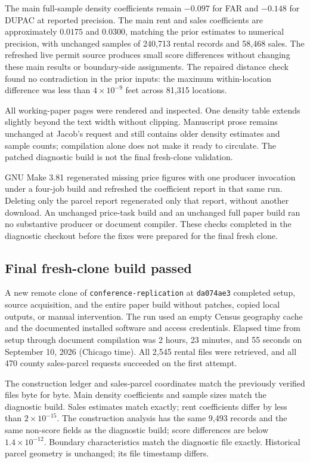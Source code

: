 The main full-sample density coefficients remain $-0.097$ for FAR and $-0.148$
for DUPAC at reported precision. The main rent and sales coefficients are
approximately $0.0175$ and $0.0300$, matching the prior estimates to numerical
precision, with unchanged samples of 240,713 rental records and 58,468 sales.
The refreshed live permit source produces small score differences without
changing these main results or boundary-side assignments. The repaired distance
check found no contradiction in the prior inputs: the maximum within-location
difference was less than $4\times10^{-9}$ feet across 81,315 locations.

All working-paper pages were rendered and inspected. One density table extends
slightly beyond the text width without clipping. Manuscript prose remains
unchanged at Jacob's request and still contains older density estimates and
sample counts; compilation alone does not make it ready to circulate. The
patched diagnostic build is not the final fresh-clone validation.

GNU Make 3.81 regenerated missing price figures with one producer invocation
under a four-job build and refreshed the coefficient report in that same run.
Deleting only the parcel report regenerated only that report, without another
download. An unchanged price-task build and an unchanged full paper build ran
no substantive producer or document compiler. These checks completed in the
diagnostic checkout before the fixes were prepared for the final fresh clone.

\subsection*{Final fresh-clone build passed}
A new remote clone of \texttt{conference-replication} at \texttt{da074ae3}
completed setup, source acquisition, and the entire paper build without patches,
copied local outputs, or manual intervention. The run used an empty Census
geography cache and the documented installed software and access credentials.
Elapsed time from setup through document compilation was 2 hours, 23 minutes,
and 55 seconds on September 10, 2026 (Chicago time). All 2,545 rental files were
retrieved, and all 470 county sales-parcel requests succeeded on the first attempt.

The construction ledger and sales-parcel coordinates match the previously
verified files byte for byte. Main density coefficients and sample sizes match
the diagnostic build. Sales estimates match exactly; rent coefficients differ
by less than $2\times10^{-15}$. The construction analysis has the same 9,493
records and the same non-score fields as the diagnostic build; score differences
are below $1.4\times10^{-12}$. Boundary characteristics match the diagnostic
file exactly. Historical parcel geometry is unchanged; its file timestamp differs.

